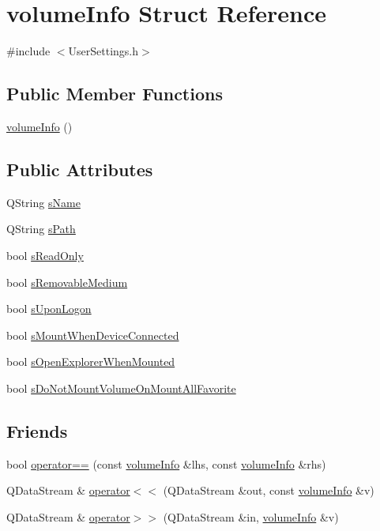 \hypertarget{structvolume_info}{}\section{volume\+Info Struct Reference}
\label{structvolume_info}


{\ttfamily \#include $<$User\+Settings.\+h$>$}

\subsection*{Public Member Functions}
\begin{DoxyCompactItemize}
\item 
\hyperlink{structvolume_info_a13ce8308954665539c5aad9d6ab623d4}{volume\+Info} ()
\end{DoxyCompactItemize}
\subsection*{Public Attributes}
\begin{DoxyCompactItemize}
\item 
Q\+String \hyperlink{structvolume_info_a5d141e94a66414f437e7c9eb6cb779f6}{s\+Name}
\item 
Q\+String \hyperlink{structvolume_info_adceb052130c087d1e2154e9286c7c3aa}{s\+Path}
\item 
bool \hyperlink{structvolume_info_a91f5b7788703db66cd63b0a1287e8323}{s\+Read\+Only}
\item 
bool \hyperlink{structvolume_info_afb218594cff74c3c73e9a8caa19468b6}{s\+Removable\+Medium}
\item 
bool \hyperlink{structvolume_info_ad49a2d984dc6afc9afdda5cfa4a5251f}{s\+Upon\+Logon}
\item 
bool \hyperlink{structvolume_info_aff29d1ee5b61dd4e208c78cf7c6e5570}{s\+Mount\+When\+Device\+Connected}
\item 
bool \hyperlink{structvolume_info_aa9f109a013ca3940ede0dc7b479b3c18}{s\+Open\+Explorer\+When\+Mounted}
\item 
bool \hyperlink{structvolume_info_a4414e1d653028a9be3121f49f01e9cd6}{s\+Do\+Not\+Mount\+Volume\+On\+Mount\+All\+Favorite}
\end{DoxyCompactItemize}
\subsection*{Friends}
\begin{DoxyCompactItemize}
\item 
bool \hyperlink{structvolume_info_a4c2860a6e40222e89edc0c2b0cff7ceb}{operator==} (const \hyperlink{structvolume_info}{volume\+Info} \&lhs, const \hyperlink{structvolume_info}{volume\+Info} \&rhs)
\item 
Q\+Data\+Stream \& \hyperlink{structvolume_info_a0ebfb5cce6a4d9f825b4a0fe6c807216}{operator$<$$<$} (Q\+Data\+Stream \&out, const \hyperlink{structvolume_info}{volume\+Info} \&v)
\item 
Q\+Data\+Stream \& \hyperlink{structvolume_info_a798abc6a677bf3fd11596df68549bdaf}{operator$>$$>$} (Q\+Data\+Stream \&in, \hyperlink{structvolume_info}{volume\+Info} \&v)
\end{DoxyCompactItemize}


